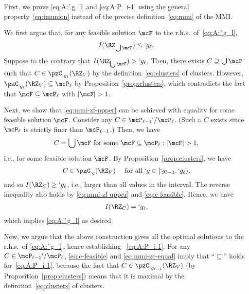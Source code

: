 \begin{Proof}
	First, we prove \eqref{eq:A:`g_l} and \eqref{eq:A:P_i-1} using the general
	property~\eqref{eq:imunion} instead of the precise definition~\eqref{eq:mmi} of the MMI. 
	
	We first argue that, for any feasible solution $\mcF$ to the r.h.s.\ of~\eqref{eq:A:`g_l}, 
	\begin{align}
		\label{eq:mmi-zf-upper}
		I(\RZ_{\bigcup\mcF}) \leq `g_\ell.
	\end{align}
	Suppose to the contrary that $I(\RZ_{\bigcup\mcF})>`g_{\ell}$. Then, there exists
	$C\supseteq\bigcup \mcF$ such that
	$C\in \pzC_{`g_\ell}(\RZ_V)$ by the definition~\eqref{eq:clusters} of clusters. However,
	$\pzC_{`g_\ell}(\RZ_V)\subseteq \mcP_{\ell}$ by Proposition~\ref{prop:clusters}, which
	contradicts the fact that $\mcF\subseteq \mcP_{\ell}$ with $\abs {\mcF}>1$. 
	
	Next, we show that \eqref{eq:mmi-zf-upper} can be achieved with equality for some feasible solution $\mcF$.
	Consider any $C\in \mcP_{\ell-1}`/\mcP_{\ell}$. (Such a $C$ exists since $\mcP_{\ell}$ is
	strictly finer than $\mcP_{\ell-1}$.) Then, we have 
	\begin{align}
	C
	= \bigcup \mcF\text{ for some }\mcF \subseteq \mcP_{\ell}:|\mcF| > 1,
	\label{eq:c-feasible}
	\end{align}
	i.e., for some feasible solution $\mcF$.
	By Proposition~\ref{prop:clusters}, we have 
	\begin{align*}
		C\in \pzC_{`g}(\RZ_V)\kern1em \text{ for all
		 }`g\in [`g_{\ell-1},`g_\ell),
	\end{align*}
	and so $I(\RZ_C)\geq `g_\ell$, i.e., larger than all values in the interval.
	The reverse inequality also holds by \eqref{eq:mmi-zf-upper} and \eqref{eq:c-feasible}. Hence, we have
	\begin{align}
		I(\RZ_C)
		=`g_\ell,
		\label{eq:mmi-zc-equal}
	\end{align}
	 which implies \eqref{eq:A:`g_l} as desired. 
	
	Now, we argue that the above construction gives all the optimal solutions to the r.h.s.\ of
	\eqref{eq:A:`g_l}, hence establishing ~\eqref{eq:A:P_i-1}. For any $C\in
	\mcP_{\ell-1}`/\mcP_{\ell}$, \eqref{eq:c-feasible} and \eqref{eq:mmi-zc-equal} imply that ``$\subseteq$'' holds
	for~\eqref{eq:A:P_i-1}, because 
	the fact that $C\in \pzC_{`g_{\ell-1}}(\RZ_V)$ (by Proposition~\ref{prop:clusters}) means that it
	is maximal by the definition~\eqref{eq:clusters} of  clusters. 
	

\end{Proof}
